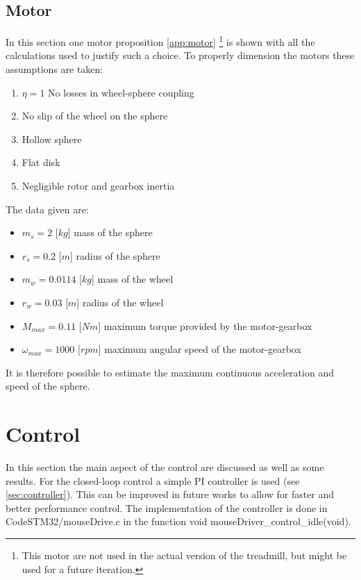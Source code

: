 \documentclass[12pt,a4paper, twoside]{article}
\begin{document}
\subsection{Motor}
In this section one motor proposition \ref{app:motor} \footnote{This motor are not used in the actual version of the treadmill, but might be used for a future iteration.} is shown with all the calculations used to justify such a choice.
To properly dimension the motors these assumptions are taken:
\begin{multicols}{2}[]
\begin{enumerate}
	\item $\eta = 1$ No losses in wheel-sphere coupling
	\item No slip of the wheel on the sphere
	\item Hollow sphere
	\item Flat disk
	\item Negligible rotor and gearbox inertia 
\end{enumerate}
\end{multicols}
The data given are:
\begin{multicols}{2}[]
\begin{itemize}
	\item $m_s = 2$ [$kg$] mass of the sphere
	\item $r_s = 0.2$ [$m$] radius of the sphere
	\item $m_w = 0.0114$ [$kg$] mass of the wheel
	\item $r_w = 0.03$ [$m$] radius of the wheel
	\item $M_{max} = 0.11$ [$Nm$] maximum torque provided by the motor-gearbox 
	\item $\omega_{max} = 1000$ [$rpm$] maximum angular speed of the motor-gearbox
\end{itemize}
\end{multicols}

It is therefore possible to estimate the maximum continuous acceleration and speed of the sphere.


\section{Control} \label{sec:control}
In this section the main aspect of the control are discussed as well as some results.
For the closed-loop control a simple PI controller is used (see \ref{sec:controller}). This can be improved in future works to allow for faster and better performance control. The implementation of the controller is done in CodeSTM32/mouseDrive.c in the function void mouseDriver\_control\_idle(void). 
\end{document}
